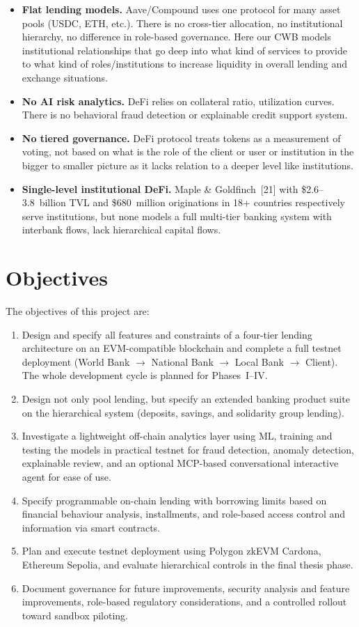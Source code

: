 \documentclass[12pt,a4paper]{report}
\begin{document}
\begin{itemize}[noitemsep]
\item \textbf{Flat lending models.} Aave/Compound uses one protocol for many asset pools (USDC, ETH, etc.). There is no cross-tier allocation, no institutional hierarchy, no difference in role-based governance. Here our CWB models institutional relationships that go deep into what kind of services to provide to what kind of roles/institutions to increase liquidity in overall lending and exchange situations.
\item \textbf{No AI risk analytics.} DeFi relies on collateral ratio, utilization curves. There is no behavioral fraud detection or explainable credit support system.
\item \textbf{No tiered governance.} DeFi protocol treats tokens as a measurement of voting, not based on what is the role of the client or user or institution in the bigger to smaller picture as it lacks relation to a deeper level like institutions.
\item \textbf{Single-level institutional DeFi.} Maple \& Goldfinch~[21] with \$2.6--3.8~billion TVL and \$680~million originations in 18+ countries respectively serve institutions, but none models a full multi-tier banking system with interbank flows, lack hierarchical capital flows.
\end{itemize}

\section{Objectives}

The objectives of this project are:

\begin{enumerate}[noitemsep]
\item Design and specify all features and constraints of a four-tier lending architecture on an EVM-compatible blockchain and complete a full testnet deployment (World Bank $\to$ National Bank $\to$ Local Bank $\to$ Client). The whole development cycle is planned for Phases~I--IV.
\item Design not only pool lending, but specify an extended banking product suite on the hierarchical system (deposits, savings, and solidarity group lending).
\item Investigate a lightweight off-chain analytics layer using ML, training and testing the models in practical testnet for fraud detection, anomaly detection, explainable review, and an optional MCP-based conversational interactive agent for ease of use.
\item Specify programmable on-chain lending with borrowing limits based on financial behaviour analysis, installments, and role-based access control and information via smart contracts.
\item Plan and execute testnet deployment using Polygon zkEVM Cardona, Ethereum Sepolia, and evaluate hierarchical controls in the final thesis phase.
\item Document governance for future improvements, security analysis and feature improvements, role-based regulatory considerations, and a controlled rollout toward sandbox piloting.
\end{enumerate}
\end{document}
